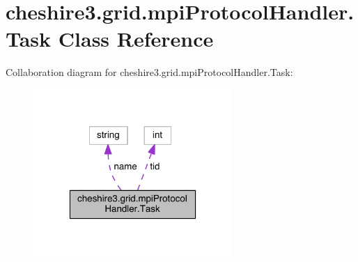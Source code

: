 \hypertarget{classcheshire3_1_1grid_1_1mpi_protocol_handler_1_1_task}{\section{cheshire3.\-grid.\-mpi\-Protocol\-Handler.\-Task Class Reference}
\label{classcheshire3_1_1grid_1_1mpi_protocol_handler_1_1_task}
}


Collaboration diagram for cheshire3.\-grid.\-mpi\-Protocol\-Handler.\-Task\-:
\nopagebreak
\begin{figure}[H]
\begin{center}
\leavevmode
\includegraphics[width=214pt]{classcheshire3_1_1grid_1_1mpi_protocol_handler_1_1_task__coll__graph}
\end{center}
\end{figure}
